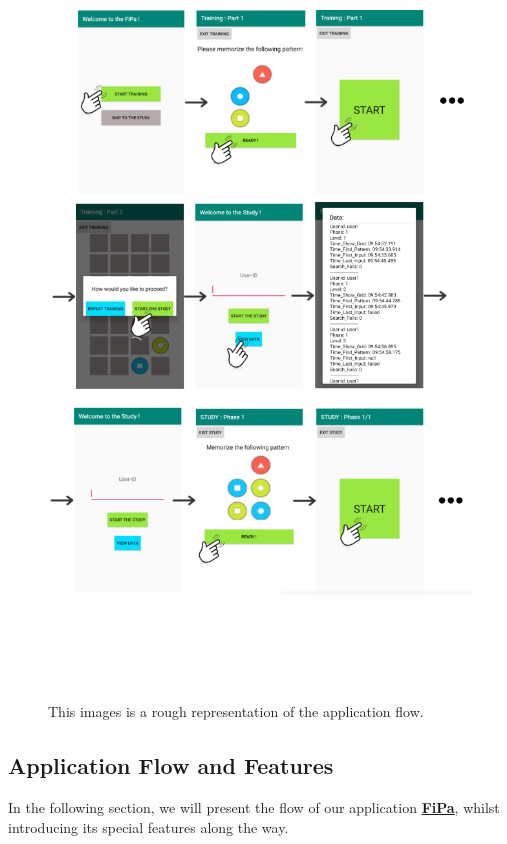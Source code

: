 \begin{figure}[t!]
\centering
\includegraphics[width=15cm, height=21cm]{Chapters/graphics/flow.PNG}
\caption{This images is a rough representation of the application flow.}
\label{fig:flow}
\end{figure}

\subsection{Application Flow and Features} \label{4.3.2}

In the following section, we will present the flow of our application \underline{\textbf{FiPa}}, whilst introducing its special features along the way. \\

